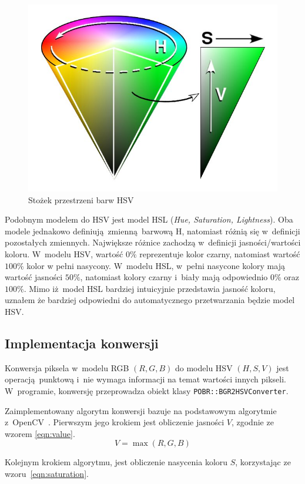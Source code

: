 \begin{figure}[h]
    \centering
    \includegraphics[width=0.6\columnwidth]{./figures/HSV_cone.jpg}
    \caption{Stożek przestrzeni barw HSV~\cite{WikipediaPL:hsvCone}}
    \label{fig:hsv}
\end{figure}   

Podobnym modelem do HSV jest model HSL (\textit{Hue, Saturation, Lightness}). Oba modele jednakowo definiują zmienną barwową H, natomiast różnią się w~definicji pozostałych zmiennych. Największe różnice zachodzą w~definicji jasności/wartości koloru. W~modelu HSV, wartość $0\%$ reprezentuje kolor czarny, natomiast wartość $100\%$ kolor w pełni nasycony. W~modelu HSL, w~pełni nasycone kolory mają wartość jasności $50\%$, natomiast kolory czarny i~biały mają odpowiednio $0\%$ oraz $100\%$. Mimo iż model HSL bardziej intuicyjnie przedstawia jasność koloru, uznałem że bardziej odpowiedni do automatycznego przetwarzania będzie model HSV.

\subsection{Implementacja konwersji}
Konwersja piksela w~modelu RGB $(R, G, B)$ do modelu HSV $(H,S,V)$ jest operacją punktową i~nie wymaga informacji na temat wartości innych pikseli. W~programie, konwersję przeprowadza obiekt klasy \texttt{POBR::BGR2HSVConverter}.  

Zaimplementowany algorytm konwersji bazuje na podstawowym algorytmie z~OpenCV~\cite{opencv-conversions}. Pierwszym jego krokiem jest obliczenie jasności $V$, zgodnie ze wzorem \ref{eqn:value}.
\smallskip
\begin{equation}
    \label{eqn:value}
    V = \max{(R, G, B)}
\end{equation}

Kolejnym krokiem algorytmu, jest obliczenie nasycenia koloru $S$, korzystając ze wzoru~\ref{eqn:saturation}.

